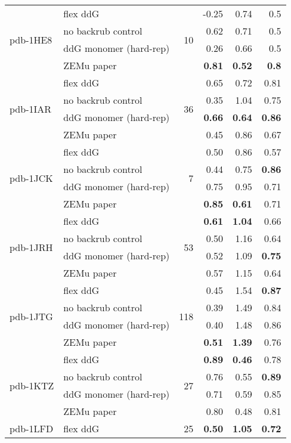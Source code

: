 \begin{table}
\begin{tabular}{llrrrr}
\hline
 \multirow{ 4}{*}{pdb-1HE8} & flex ddG & \multirow{ 4}{*}{10} & -0.25 & 0.74 & 0.5  \\
 & no backrub control & & 0.62 & 0.71 & 0.5  \\
 & ddG monomer (hard-rep) & & 0.26 & 0.66 & 0.5  \\
 & ZEMu paper & & \textbf{0.81} & \textbf{0.52} & \textbf{0.8}  \\
\hline
 \multirow{ 4}{*}{pdb-1IAR} & flex ddG & \multirow{ 4}{*}{36} & 0.65 & 0.72 & 0.81  \\
 & no backrub control & & 0.35 & 1.04 & 0.75  \\
 & ddG monomer (hard-rep) & & \textbf{0.66} & \textbf{0.64} & \textbf{0.86}  \\
 & ZEMu paper & & 0.45 & 0.86 & 0.67  \\
\hline
 \multirow{ 4}{*}{pdb-1JCK} & flex ddG & \multirow{ 4}{*}{7} & 0.50 & 0.86 & 0.57  \\
 & no backrub control & & 0.44 & 0.75 & \textbf{0.86}  \\
 & ddG monomer (hard-rep) & & 0.75 & 0.95 & 0.71  \\
 & ZEMu paper & & \textbf{0.85} & \textbf{0.61} & 0.71  \\
\hline
 \multirow{ 4}{*}{pdb-1JRH} & flex ddG & \multirow{ 4}{*}{53} & \textbf{0.61} & \textbf{1.04} & 0.66  \\
 & no backrub control & & 0.50 & 1.16 & 0.64  \\
 & ddG monomer (hard-rep) & & 0.52 & 1.09 & \textbf{0.75}  \\
 & ZEMu paper & & 0.57 & 1.15 & 0.64  \\
\hline
 \multirow{ 4}{*}{pdb-1JTG} & flex ddG & \multirow{ 4}{*}{118} & 0.45 & 1.54 & \textbf{0.87}  \\
 & no backrub control & & 0.39 & 1.49 & 0.84  \\
 & ddG monomer (hard-rep) & & 0.40 & 1.48 & 0.86  \\
 & ZEMu paper & & \textbf{0.51} & \textbf{1.39} & 0.76  \\
\hline
 \multirow{ 4}{*}{pdb-1KTZ} & flex ddG & \multirow{ 4}{*}{27} & \textbf{0.89} & \textbf{0.46} & 0.78  \\
 & no backrub control & & 0.76 & 0.55 & \textbf{0.89}  \\
 & ddG monomer (hard-rep) & & 0.71 & 0.59 & 0.85  \\
 & ZEMu paper & & 0.80 & 0.48 & 0.81  \\
\hline
 \multirow{ 4}{*}{pdb-1LFD} & flex ddG & \multirow{ 4}{*}{25} & \textbf{0.50} & \textbf{1.05} & \textbf{0.72}  \\

\end{tabular}
\end{table}

